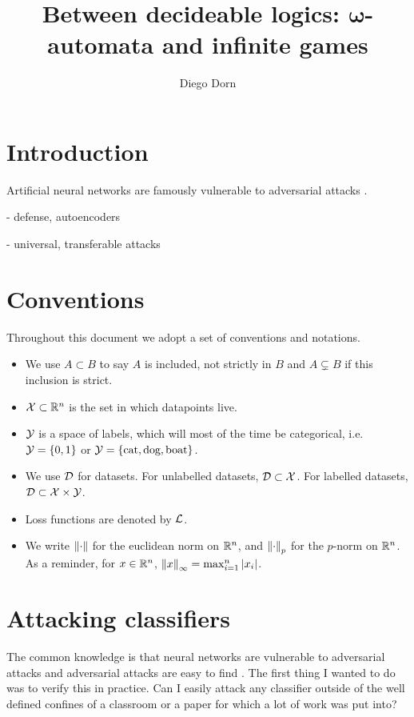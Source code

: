\documentclass[]{scrarticle}
\title{Between decideable logics: $\mathbf{\omega}$-automata and infinite games}
\author{Diego Dorn}
\begin{document}


\newpage


\section*{Introduction}

Artificial neural networks are famously vulnerable to adversarial attacks
\cite{szegedy2013intriguing,goodfellow2014explaining,liu2021survey}.

- defense, autoencoders

- universal, transferable attacks


\tableofcontents

\clearpage
\section*{Conventions}

Throughout this document we adopt a set of conventions and notations.
\begin{itemize}
  \item We use $A \subset B$ to say $A$ is included, not strictly in $B$
    and $A \subsetneq B$ if this inclusion is strict.
  \item $\mathcal X \subset \mathbb R^n$ is the set in which datapoints live.
  \item $\mathcal Y$ is a space of labels, which will most of the time be categorical,
    i.e. $\mathcal Y = \left\{ 0, 1 \right\}$ or $\mathcal Y = \left\{ \text{cat}, \text{dog}, \text{boat} \right\}$.
  \item We use $\mathcal D$ for datasets. For unlabelled datasets, $\mathcal D \subset \mathcal X$.
    For labelled datasets, $\mathcal D \subset \mathcal X \times \mathcal Y$.
  \item Loss functions are denoted by $\mathcal L$.
  \item We write $\left\| \cdot \right\|$ for the euclidean norm on $\mathbb R^n$,
    and $\left\| \cdot \right\|_p$ for the $p$-norm on $\mathbb R^n$.
    As a reminder, for $x \in \mathbb R^n$, $\left\| x \right\|_\infty = \max_{i=1}^n \left| x_i \right|$.
\end{itemize}


\clearpage

\section{Attacking classifiers}
The common knowledge is that neural networks are vulnerable to adversarial attacks
and adversarial attacks are easy to find \cite{szegedy2013intriguing,goodfellow2014explaining,liu2021survey}.
The first thing I wanted to do was to verify this in practice. Can I easily
attack any classifier outside of the well defined confines of a classroom
or a paper for which a lot of work was put into?
\end{document}
